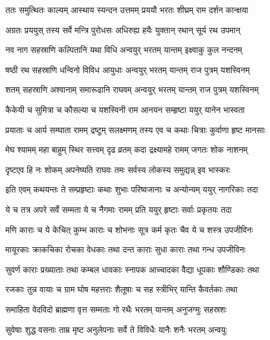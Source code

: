 
\twolineshloka
{ततः समुत्थितः काल्यम् आस्थाय स्यन्दन उत्तमम्}
{प्रययौ भरतः शीघ्रम् राम दर्शन कान्क्षया} %

\twolineshloka
{अग्रतः प्रययुस् तस्य सर्वे मन्त्रि पुरोधसः}
{अधिरुह्य हयैः युक्तान् रथान् सूर्य रथ उपमान्} %

\twolineshloka
{नव नाग सहस्राणि कल्पितानि यथा विधि}
{अन्वयुर् भरतम् यान्तम् इक्ष्वाकु कुल नन्दनम्} %

\twolineshloka
{षष्ठी रथ सहस्राणि धन्विनो विविध आयुधाः}
{अन्वयुर् भरतम् यान्तम् राज पुत्रम् यशस्विनम्} %

\twolineshloka
{शतम् सहस्राणि अश्वानाम् समारूढानि राघवम्}
{अन्वयुर् भरतम् यान्तम् राज पुत्रम् यशस्विनम्} %

\twolineshloka
{कैकेयी च सुमित्रा च कौसल्या च यशस्विनी}
{राम आनयन सम्हृष्टा ययुर् यानेन भास्वता} %

\twolineshloka
{प्रयाताः च आर्य सम्घाता रामम् द्रष्टुम् सलक्ष्मणम्}
{तस्य एव च कथाः चित्राः कुर्वाणा हृष्ट मानसाः} %

\twolineshloka
{मेघ श्यामम् महा बाहुम् स्थिर सत्त्वम् दृढ व्रतम्}
{कदा द्रक्ष्यामहे रामम् जगतः शोक नाशनम्} %

\twolineshloka
{दृष्टएव हि नः शोकम् अपनेष्यति राघवः}
{तमः सर्वस्य लोकस्य समुद्यन्न् इव भास्करः} %

\twolineshloka
{इति एवम् कथयन्तः ते सम्प्रहृष्टाः कथाः शुभाः}
{परिष्वजानाः च अन्योन्यम् ययुर् नागरिकाः तदा} %

\twolineshloka
{ये च तत्र अपरे सर्वे सम्मता ये च नैगमाः}
{रामम् प्रति ययुर् हृष्टाः सर्वाः प्रकृतयः तदा} %

\twolineshloka
{मणि काराः च ये केचित् कुम्भ काराः च शोभनाः}
{सूत्र कर्म कृतः चैव ये च शस्त्र उपजीविनः} %

\twolineshloka
{मायूरकाः क्राकचिका रोचका वेधकाः तथा}
{दन्त काराः सुधा काराः तथा गन्ध उपजीविनः} %

\twolineshloka
{सुवर्ण काराः प्रख्याताः तथा कम्बल धावकाः}
{स्नापक आच्चादका वैद्या धूपकाः शौण्डिकाः तथा} %

\twolineshloka
{रजकाः तुन्न वायाः च ग्राम घोष महत्तराः}
{शैलूषाः च सह स्त्रीभिर् यान्ति कैवर्तकाः तथा} %

\twolineshloka
{समाहिता वेदविदो ब्राह्मणा वृत्त सम्मताः}
{गो रथैः भरतम् यान्तम् अनुजग्मुः सहस्रशः} %

\twolineshloka
{सुवेषाः शुद्ध वसनाः ताम्र मृष्ट अनुलेपनाः}
{सर्वे ते विविधैः यानैः शनैः भरतम् अन्वयुः} %

